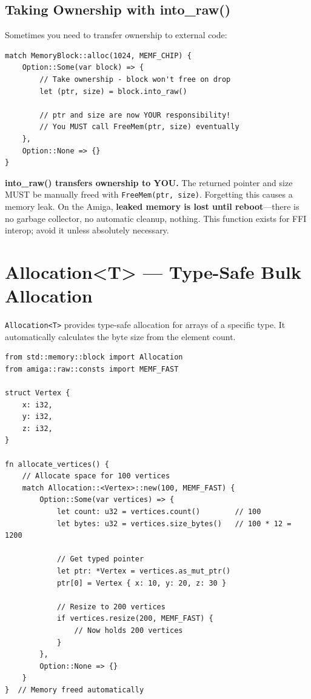 \subsection{Taking Ownership with into\_raw()}

Sometimes you need to transfer ownership to external code:

\begin{lstlisting}
match MemoryBlock::alloc(1024, MEMF_CHIP) {
    Option::Some(var block) => {
        // Take ownership - block won't free on drop
        let (ptr, size) = block.into_raw()

        // ptr and size are now YOUR responsibility!
        // You MUST call FreeMem(ptr, size) eventually
    },
    Option::None => {}
}
\end{lstlisting}

\begin{warningbox}
\textbf{into\_raw() transfers ownership to YOU.} The returned pointer and size MUST be manually freed with \texttt{FreeMem(ptr, size)}. Forgetting this causes a memory leak. On the Amiga, \textbf{leaked memory is lost until reboot}---there is no garbage collector, no automatic cleanup, nothing. This function exists for FFI interop; avoid it unless absolutely necessary.
\end{warningbox}

\section{Allocation<T> --- Type-Safe Bulk Allocation}
\label{sec:allocation}

\texttt{Allocation<T>} provides type-safe allocation for arrays of a specific type. It automatically calculates the byte size from the element count.

\begin{lstlisting}
from std::memory::block import Allocation
from amiga::raw::consts import MEMF_FAST

struct Vertex {
    x: i32,
    y: i32,
    z: i32,
}

fn allocate_vertices() {
    // Allocate space for 100 vertices
    match Allocation::<Vertex>::new(100, MEMF_FAST) {
        Option::Some(var vertices) => {
            let count: u32 = vertices.count()        // 100
            let bytes: u32 = vertices.size_bytes()   // 100 * 12 = 1200

            // Get typed pointer
            let ptr: *Vertex = vertices.as_mut_ptr()
            ptr[0] = Vertex { x: 10, y: 20, z: 30 }

            // Resize to 200 vertices
            if vertices.resize(200, MEMF_FAST) {
                // Now holds 200 vertices
            }
        },
        Option::None => {}
    }
}  // Memory freed automatically
\end{lstlisting}

